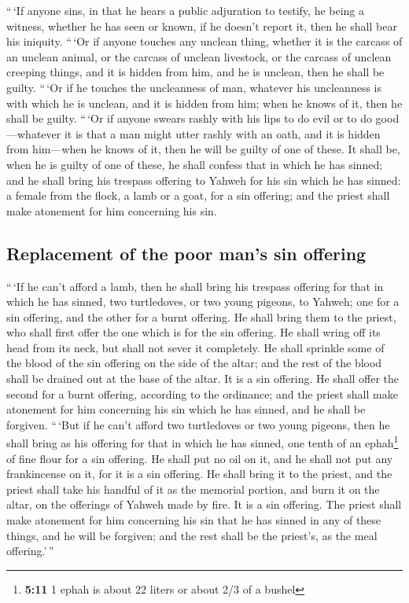  ``\,`If anyone sins, in that he hears a public adjuration
to testify, he being a witness, whether he has seen or known, if he
doesn't report it, then he shall bear his iniquity. 
``\,`Or if anyone touches any unclean thing, whether it is the carcass
of an unclean animal, or the carcass of unclean livestock, or the
carcass of unclean creeping things, and it is hidden from him, and he is
unclean, then he shall be guilty.  ``\,`Or if he touches
the uncleanness of man, whatever his uncleanness is with which he is
unclean, and it is hidden from him; when he knows of it, then he shall
be guilty.  ``\,`Or if anyone swears rashly with his lips
to do evil or to do good---whatever it is that a man might utter rashly
with an oath, and it is hidden from him---when he knows of it, then he
will be guilty of one of these.  It shall be, when he is
guilty of one of these, he shall confess that in which he has sinned;
 and he shall bring his trespass offering to Yahweh for
his sin which he has sinned: a female from the flock, a lamb or a goat,
for a sin offering; and the priest shall make atonement for him
concerning his sin.

\hypertarget{replacement-of-the-poor-mans-sin-offering}{%
\subsection{Replacement of the poor man's sin
offering}\label{replacement-of-the-poor-mans-sin-offering}}

 ``\,`If he can't afford a lamb, then he shall bring his
trespass offering for that in which he has sinned, two turtledoves, or
two young pigeons, to Yahweh; one for a sin offering, and the other for
a burnt offering.  He shall bring them to the priest, who
shall first offer the one which is for the sin offering. He shall wring
off its head from its neck, but shall not sever it completely.
 He shall sprinkle some of the blood of the sin offering
on the side of the altar; and the rest of the blood shall be drained out
at the base of the altar. It is a sin offering.  He shall
offer the second for a burnt offering, according to the ordinance; and
the priest shall make atonement for him concerning his sin which he has
sinned, and he shall be forgiven.  ``\,`But if he can't
afford two turtledoves or two young pigeons, then he shall bring as his
offering for that in which he has sinned, one tenth of an
ephah\footnote{\textbf{5:11} 1 ephah is about 22 liters or about 2/3 of
  a bushel} of fine flour for a sin offering. He shall put no oil on it,
and he shall not put any frankincense on it, for it is a sin offering.
 He shall bring it to the priest, and the priest shall
take his handful of it as the memorial portion, and burn it on the
altar, on the offerings of Yahweh made by fire. It is a sin offering.
 The priest shall make atonement for him concerning his
sin that he has sinned in any of these things, and he will be forgiven;
and the rest shall be the priest's, as the meal offering.'\,''

